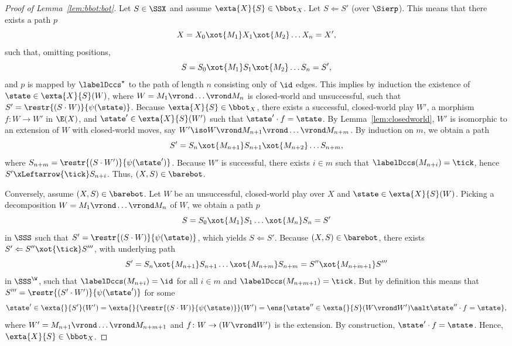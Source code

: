 \documentclass{LMCS}
\theoremstyle{plain}\newtheorem{satz}[thm]{Satz}
\begin{document}
\begin{proof}[Proof of Lemma~\ref{lem:bbot:bot}]
  Let $S \in \SSX$ and assume $\exta{X}{S} \in
  \bbot_X$. Let $S \Leftarrow S'$ (over $\Sierp$).  This
  means that there exists a path $p$
$$X = X_0 \xot{M_1} X_1 \xot{M_2} \ldots X_n = X',$$
such that, omitting positions, 
$$S = S_0 \xot{M_1} S_1 \xot{M_2} \ldots S_n = S',$$
and $p$ is mapped by $\labelDccs^\star$ to the path of length $n$ consisting
only of $\id$ edges. This implies by induction the existence of
$\state \in \exta{X}{S}(W)$, where $W = M_1 \vrond \ldots \vrond M_n$
is closed-world and unsuccessful, such that $S' = \restr{(S \cdot
  W)}{\psi(\state)}$.  Because $\exta{X}{S} \in \bbot_X$, there exists a
successful, closed-world play $W'$, a morphism $f \colon W \to W'$ in $\E(X)$, and $\state' \in
\exta{X}{S}(W')$ such that $\state' \cdot f = \state$.  By
Lemma~\ref{lem:closedworld}, $W'$ is isomorphic to an extension of $W$ with
closed-world moves, say $W' \iso W \vrond M_{n+1} \vrond \ldots \vrond
M_{n+m}$. By induction on $m$, we obtain a path
$$S' = S_n \xot{M_{n+1}} S_{n+1} \xot{M_{n+2}} \ldots S_{n+m},$$ where $S_{n+m} = \restr{(S \cdot
  W')}{\psi(\state')}$. Because $W'$ is successful, there exists $i \in m$
such that $\labelDccs(M_{n+i}) = \tick$, hence $S' \xLeftarrow{\tick}
S_{n+i}$. Thus, $(X,S) \in \barebot$.

Conversely, assume $(X,S) \in \barebot$. Let $W$ be an
unsuccessful, closed-world play over $X$ and $\state \in
\exta{X}{S}(W)$. Picking a decomposition $W = M_1 \vrond \ldots \vrond
M_n$ of $W$, we obtain a path $p$
$$S = S_0 \xot{M_1} S_1 \ldots \xot{M_n} S_n = S'$$
in $\SSS$ such that $S' = \restr{(S \cdot W)}{\psi(\state)}$, which 
yields $S \Leftarrow S'$. Because $(X,S) \in \barebot$, there exists
$S' \Leftarrow S'' \xot{\tick} S'''$, with underlying path
$$S' = S_n \xot{M_{n+1}} S_{n+1} \ldots \xot{M_{n+m}} S_{n+m} = S'' \xot{M_{n+m+1}} S'''$$
in $\SSS^\W$, such
that $\labelDccs(M_{n+i}) = \id$ for all $i \in m$ and $\labelDccs(M_{n+m+1}) =
\tick$.  But by definition this means that $S''' = \restr{(S' \cdot
  W')}{\psi(\state')}$ for some
$$\state' \in \exta{}{S'}(W') = \exta{}{\restr{(S \cdot W)}{\psi(\state)}}(W') 
= \ens{\state'' \in \exta{}{S}(W \vrond W') \aalt \state''
  \cdot f = \state},$$ where $W' = M_{n+1} \vrond \ldots \vrond
M_{n+m+1}$ and $f \colon W \to (W \vrond W')$ is the extension.
By construction, $\state' \cdot f = \state$. Hence, $\exta{X}{S} \in \bbot_X$.  
\end{proof}
\end{document}
